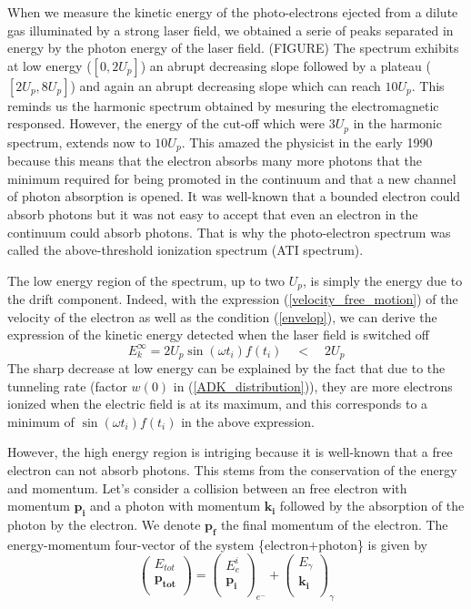 \documentclass[a4paper]{article}
\begin{document}
When we measure the kinetic energy of the photo-electrons ejected from a dilute gas illuminated by a strong laser field, we obtained a serie of peaks separated in energy by the photon energy of the laser field. (FIGURE) The spectrum exhibits at low energy ($[0,2U_{p}]$) an abrupt decreasing slope followed by a plateau ($[2U_{p},8U_{p}]$) and again an abrupt decreasing slope which can reach $10 U_{p}$. This reminds us the harmonic spectrum obtained by mesuring the electromagnetic responsed. However, the energy of the cut-off which were $3U_{p}$ in the harmonic spectrum, extends now to $10U_{p}$. This amazed the physicist in the early 1990 because this means that the electron absorbs many more photons that the minimum required for being promoted in the continuum and that a new channel of photon absorption is opened. It was well-known that a bounded electron could absorb photons but it was not easy to accept that even an electron in the continuum could absorb photons. That is why the photo-electron spectrum was called the above-threshold ionization spectrum (ATI spectrum).
\par
The low energy region of the spectrum, up to two $U_{p}$, is simply the energy due to the drift component. Indeed, with the expression (\ref{velocity_free_motion}) of the velocity of the electron as well as the condition (\ref{envelop}), we can derive the expression of the kinetic energy detected when the laser field is switched off
\begin{equation}
E_{k}^{\infty}=2U_{p}\sin(\omega t_{i})f(t_{i}) \quad < \quad 2U_{p}
\end{equation}
The sharp decrease at low energy can be explained by the fact that due to the tunneling rate (factor $w(0)$ in (\ref{ADK_distribution})), they are more electrons ionized when the electric field is at its maximum, and this corresponds to a minimum of $\sin(\omega t_{i})f(t_{i})$ in the above expression.
\par
However, the high energy region is intriging because it is well-known that a free electron can not absorb photons. This stems from the conservation of the energy and momentum. Let's consider a collision between an free electron with momentum $\mathbf{p_{i}}$ and a photon with momentum $\mathbf{k_{i}}$ followed by the absorption of the photon by the electron. We denote $\mathbf{p_{f}}$ the final momentum of the electron. The energy-momentum four-vector of the system \{electron$+$photon\} is given by
\begin{equation}
\left(
\begin{array}{c}
E_{tot}\\
\mathbf{p_{tot}}\\
\end{array}
\right)
=
\left(
\begin{array}{c}
E_{e}^{i}\\
\mathbf{p_{i}}\\
\end{array}
\right)_{e^{-}}
+\left(
\begin{array}{c}
E_{\gamma}\\
\mathbf{k_{i}}\\
\end{array}
\right)_{\gamma}
\end{equation}
\end{document}
